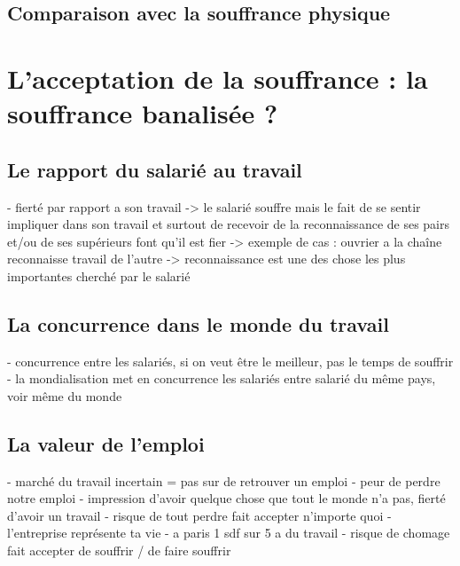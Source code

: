 \documentclass{report}
\begin{document}

	\section{Comparaison avec la souffrance physique}
		\paragraph{}

\chapter{L’acceptation de la souffrance : la souffrance banalisée ?}
	\section{Le rapport du salarié au travail}
		- fierté par rapport a son travail
			-> le salarié souffre mais le fait de se sentir impliquer dans son travail et surtout de recevoir de la reconnaissance de ses pairs et/ou de ses supérieurs font qu'il est fier
			-> exemple de cas : ouvrier a la chaîne reconnaisse travail de l'autre
			-> reconnaissance est une des chose les plus importantes cherché par le salarié
	\section{La concurrence dans le monde du travail}
		- concurrence entre les salariés, si on veut être le meilleur, pas le temps de souffrir
		- la mondialisation met en concurrence les salariés entre salarié du même pays, voir même du monde 
	\section{La valeur de l'emploi}
		- marché du travail incertain = pas sur de retrouver un emploi
		- peur de perdre notre emploi
		- impression d'avoir quelque chose que tout le monde n'a pas, fierté d'avoir un travail
		- risque de tout perdre fait accepter n'importe quoi
		- l'entreprise représente ta vie
		- a paris 1 sdf sur 5 a du travail
		- risque de chomage fait accepter de souffrir / de faire souffrir
\end{document}
